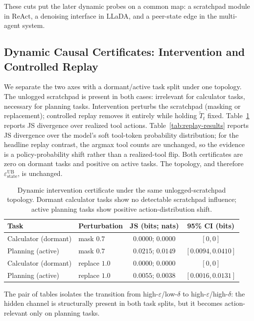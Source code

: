 \documentclass{article}
\begin{document}
These cuts put the later dynamic probes on a common map: a scratchpad module in ReAct, a denoising interface in LLaDA, and a peer-state edge in the multi-agent system.

\subsection{Dynamic Causal Certificates: Intervention and Controlled Replay}
\label{sec:exp-intervention}

We separate the two axes with a dormant/active task split under one topology. The unlogged scratchpad is present in both cases: irrelevant for calculator tasks, necessary for planning tasks. Intervention perturbs the scratchpad (masking or replacement); controlled replay removes it entirely while holding $\tilde T_t$ fixed. Table~\ref{tab:intervention-results} reports JS divergence over realized tool actions. Table~\ref{tab:replay-results} reports JS divergence over the model's soft tool-token probability distribution; for the headline replay contrast, the argmax tool counts are unchanged, so the evidence is a policy-probability shift rather than a realized-tool flip. Both certificates are zero on dormant tasks and positive on active tasks. The topology, and therefore $\varepsilon_\text{state}^\text{UB}$, is unchanged.

\begin{table}[t]
\centering
\begin{tabular}{llcc}
\toprule
Task & Perturbation & JS (bits; nats) & 95\% CI (bits) \\
\midrule
Calculator (dormant) & mask $0.7$ & $0.0000$; $0.0000$ & $[0,0]$ \\
Planning (active) & mask $0.7$ & $0.0215$; $0.0149$ & $[0.0094,0.0410]$ \\
Calculator (dormant) & replace $1.0$ & $0.0000$; $0.0000$ & $[0,0]$ \\
Planning (active) & replace $1.0$ & $0.0055$; $0.0038$ & $[0.0016,0.0131]$ \\
\bottomrule
\end{tabular}
\caption{Dynamic intervention certificate under the same unlogged-scratchpad topology. Dormant calculator tasks show no detectable scratchpad influence; active planning tasks show positive action-distribution shift.}
\label{tab:intervention-results}
\end{table}

The pair of tables isolates the transition from high-$\varepsilon$/low-$\delta$ to high-$\varepsilon$/high-$\delta$: the hidden channel is structurally present in both task splits, but it becomes action-relevant only on planning tasks.
\end{document}
